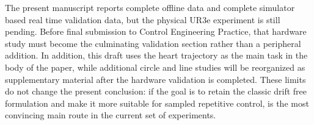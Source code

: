 The present manuscript reports complete offline data and complete simulator based real time validation data, but the physical UR3e experiment is still pending. Before final submission to Control Engineering Practice, that hardware study must become the culminating validation section rather than a peripheral addition. In addition, this draft uses the heart trajectory as the main task in the body of the paper, while additional circle and line studies will be reorganized as supplementary material after the hardware validation is completed. These limits do not change the present conclusion: if the goal is to retain the classic drift free formulation and make it more suitable for sampled repetitive control, \methodtwoDL{} is the most convincing main route in the current set of experiments.
